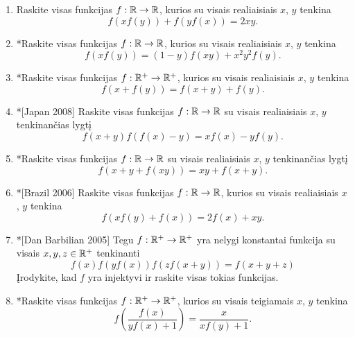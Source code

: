 \begin{enumerate}
  \item Raskite visas funkcijas $f:\mathbb R\to\mathbb R$, kurios su visais realiaisiais
    $x$, $y$ tenkina $$f(xf(y))+f(yf(x))=2xy.$$
  \item *Raskite visas funkcijas $f:\mathbb R\to\mathbb R$, kurios su visais realiaisiais
    $x$, $y$ tenkina $$f(xf(y))=(1-y)f(xy)+x^2y^2f(y).$$
  \item *Raskite visas funkcijas $f:\mathbb R^+\to\mathbb R^+$, kurios su visais
    realiaisiais $x$, $y$ tenkina $$f(x+f(y))=f(x+y)+f(y).$$
  \item *[Japan 2008] Raskite visas funkcijas $f: \mathbb R \to \mathbb R$ su visais
    realiaisiais $x$, $y$ tenkinančias lygtį
    $$f(x+y)f(f(x)-y)=xf(x)-yf(y).$$
  \item *Raskite visas funkcijas $f: \mathbb R \to \mathbb R$ su visais realiaisiais $x$,
    $y$ tenkinančias lygtį $$f(x+y+f(xy))=xy+f(x+y).$$
  \item *[Brazil 2006] Raskite visas funkcijas $f:\mathbb R\to\mathbb R$, kurios su
    visais realiaisiais $x$, $y$ tenkina $$f(xf(y)+f(x))=2f(x)+xy.$$
  \item *[Dan Barbilian 2005] Tegu $f:\mathbb R^+ \to \mathbb R^+$ yra nelygi konstantai
    funkcija su visais $x,y,z \in \mathbb R^+$ tenkinanti
    $$f(x)f(yf(x))f(zf(x+y))=f(x+y+z)$$ Įrodykite, kad $f$ yra injektyvi ir
    raskite visas tokias funkcijas.
  \item *Raskite visas funkcijas $f:\mathbb R^+\to\mathbb R^+$, kurios su visais
    teigiamais $x$, $y$ tenkina $$f\left(\frac{f(x)}{yf(x) + 1}\right) =
    \frac{x}{xf(y)+1}.$$
\end{enumerate}

